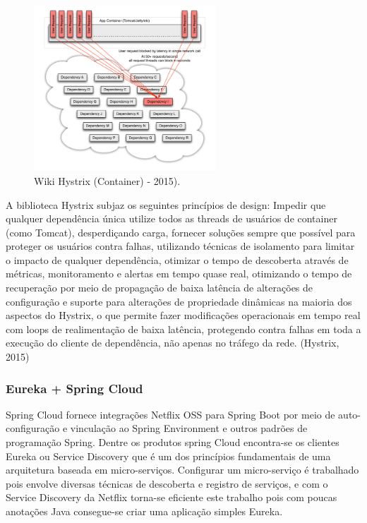 \begin{figure}[h]
\centering
\includegraphics[height=6.2cm]{imagens/figura5}
\caption{Wiki Hystrix (Container) - 2015).}
\label{fig:exemplo}
\end{figure}

A biblioteca Hystrix subjaz os seguintes princípios de design: Impedir que qualquer dependência única utilize todos as threads de usuários de container (como Tomcat), desperdiçando carga, fornecer soluções sempre que possível para proteger os usuários contra falhas, utilizando técnicas de isolamento para limitar o impacto de qualquer dependência, otimizar o tempo de descoberta através de métricas, monitoramento e alertas em tempo quase real, otimizando o tempo de recuperação por meio de propagação de baixa latência de alterações de configuração e suporte para alterações de propriedade dinâmicas na maioria dos aspectos do Hystrix, o que permite fazer modificações operacionais em tempo real com loops de realimentação de baixa latência, protegendo contra falhas em toda a execução do cliente de dependência, não apenas no tráfego da rede. (Hystrix, 2015)

\subsubsection{Eureka + Spring Cloud}
Spring Cloud fornece integrações Netflix OSS para Spring Boot por meio de auto-configuração e vinculação ao Spring Environment e outros padrões de programação Spring. Dentre os produtos spring Cloud encontra-se os clientes Eureka ou Service Discovery que é um dos princípios fundamentais de uma arquitetura baseada em micro-serviços. Configurar um micro-serviço é trabalhado pois envolve diversas técnicas de descoberta e registro de serviços, e com o Service Discovery da Netflix torna-se eficiente este trabalho pois com poucas anotações Java consegue-se criar uma aplicação simples Eureka. 

